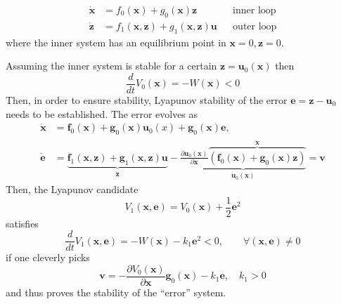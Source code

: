 \noindent\begin{align*}
    \dot{\mathbf{x}} & = f_0(\mathbf{x}) + g_0(\mathbf{x})\mathbf{z}                         &  & \text{inner loop} \\
    \dot{\mathbf{z}} & = f_1(\mathbf{x},\mathbf{z}) + g_1(\mathbf{x}, \mathbf{z}) \mathbf{u} &  & \text{outer loop}
\end{align*}
where the inner system has an equilibrium point in $\mathbf{x}=0, \mathbf{z}=0$.

\newpar{}
Assuming the inner system is stable for a certain $\mathbf{z} = \mathbf{u}_0(\mathbf{x})$ then
\noindent\begin{equation*}
    \frac{d}{dt} V_0(\mathbf{x}) = -W(\mathbf{x}) < 0
\end{equation*}
Then, in order to ensure stability, Lyapunov stability of the error $\mathbf{e} = \mathbf{z}-\mathbf{u}_0$ needs to be established.
The error evolves as
\begin{align*}
    \dot{\mathbf{x}} & =\mathbf{f}_{0}(\mathbf{x})+\mathbf{g}_{0}(\mathbf{x})\mathbf{u}_{0}(x)+\mathbf{g}_{0}(\mathbf{x})\mathbf{e},                                                                                                                                                                                                                                              \\
    \dot{\mathbf{e}} & =\underbrace{\mathbf{f}_{1}(\mathbf{x},\mathbf{z})+\mathbf{g}_{1}(\mathbf{x},\mathbf{z})\mathbf{u}}_{\dot{\mathbf{z}}}-\underbrace{\frac{\partial \mathbf{u}_{0}(\mathbf{x})}{\partial \mathbf{x}}\overbrace{\left(\mathbf{f}_{0}(\mathbf{x})+\mathbf{g}_{0}(\mathbf{x})\mathbf{z}\right)}^{\dot{\mathbf{x}}}}_{\dot{\mathbf{u}}_0(\mathbf{x})}=\mathbf{v}
\end{align*}
Then, the Lyapunov candidate
\noindent\begin{equation*}
    V_1(\mathbf{x}, \mathbf{e}) = V_0(\mathbf{x})+\frac{1}{2} \mathbf{e}^2
\end{equation*}
satisfies
\noindent\begin{equation*}
    \frac{d}{dt}V_1(\mathbf{x}, \mathbf{e}) = -W(\mathbf{x}) - k_1 \mathbf{e}^2 <0 ,\qquad \forall(\mathbf{x},\mathbf{e}) \neq 0
\end{equation*}
if one cleverly picks
\begin{equation*}
    \mathbf{v}=-\frac{\partial V_0(\mathbf{x})}{\partial \mathbf{x}}\mathbf{g}_0(\mathbf{x})-k_1\mathbf{e},\quad k_1>0
\end{equation*}
and thus proves the stability of the ``error'' system.
